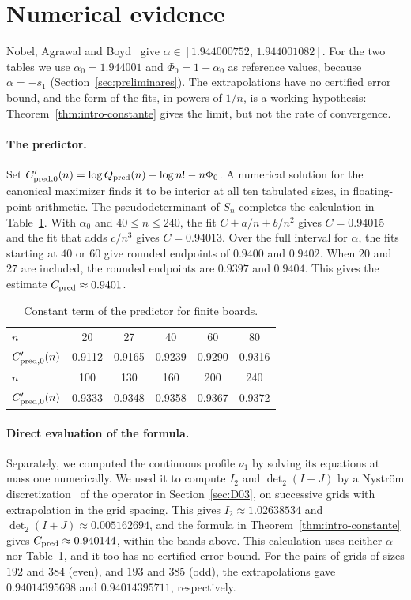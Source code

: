 \section{Numerical evidence}\label{sec:numerico}

Nobel, Agrawal and Boyd~\cite{NAB} give $\alpha\in[1.944000752,\,1.944001082]$.
For the two tables we use $\alpha_0=1.944001$ and $\Phi_0=1-\alpha_0$ as reference values,
because $\alpha=-s_1$ (Section~\ref{sec:preliminares}). The extrapolations have no certified error bound,
and the form of the fits, in powers of $1/n$, is a working hypothesis: Theorem~\ref{thm:intro-constante}
gives the limit, but not the rate of convergence.

\paragraph{The predictor.}
Set $C'_{{\rm pred},0}(n)=\log Q_{\rm pred}(n)-\log n!-n\Phi_0$. A numerical solution for the canonical
maximizer
finds it to be interior at all ten tabulated sizes, in floating-point arithmetic.
The pseudodeterminant of $S_n$ completes the calculation in Table~\ref{tab:predictor}.
With $\alpha_0$ and $40\le n\le240$, the fit $C+a/n+b/n^2$ gives $C=0.94015$ and the fit that adds $c/n^3$
gives $C=0.94013$.
Over the full interval for $\alpha$, the fits starting at $40$ or $60$ give rounded endpoints of $0.9400$
and $0.9402$.
When $20$ and $27$ are included, the rounded endpoints are $0.9397$ and $0.9404$. This gives the estimate
$C_{\rm pred}\approx0.9401$.

\begin{table}[ht]
\centering
\begin{tabular}{lccccc}
\toprule
$n$ & 20 & 27 & 40 & 60 & 80\\
$C'_{{\rm pred},0}(n)$ & 0.9112 & 0.9165 & 0.9239 & 0.9290 & 0.9316\\
\midrule
$n$ & 100 & 130 & 160 & 200 & 240\\
$C'_{{\rm pred},0}(n)$ & 0.9333 & 0.9348 & 0.9358 & 0.9367 & 0.9372\\
\bottomrule
\end{tabular}
\caption{Constant term of the predictor for finite boards.}\label{tab:predictor}
\end{table}

\paragraph{Direct evaluation of the formula.}
Separately, we computed the continuous profile $\nu_1$ by solving its equations at mass one numerically. We
used it to compute $I_2$ and $\det_2(I+J)$ by a Nyström discretization~\cite{Bornemann} of the operator in
Section~\ref{sec:D03}, on successive grids with extrapolation in the grid spacing. This gives
$I_2\approx1.02638534$ and $\det_2(I+J)\approx0.005162694$, and the formula in
Theorem~\ref{thm:intro-constante} gives $C_{\rm pred}\approx0.940144$, within the bands above. This
calculation uses neither $\alpha$ nor Table~\ref{tab:predictor}, and it too has no certified error bound.
For the pairs of grids of sizes $192$ and $384$ (even), and $193$ and $385$ (odd), the extrapolations gave
$0.94014395698$ and $0.94014395711$, respectively.

